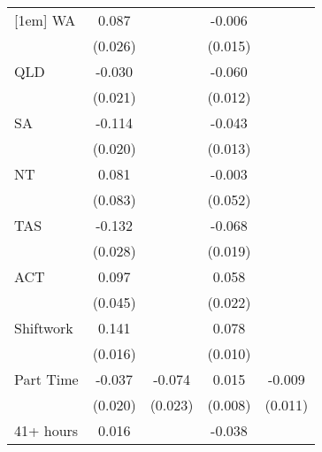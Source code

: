 {\begin{tabular}{l*{4}{c}}
[1em]
WA                  &       0.087\sym{***}&                     &      -0.006         &                     \\
                    &     (0.026)         &                     &     (0.015)         &                     \\
[1em]
QLD                 &      -0.030         &                     &      -0.060\sym{***}&                     \\
                    &     (0.021)         &                     &     (0.012)         &                     \\
[1em]
SA                  &      -0.114\sym{***}&                     &      -0.043\sym{**} &                     \\
                    &     (0.020)         &                     &     (0.013)         &                     \\
[1em]
NT                  &       0.081         &                     &      -0.003         &                     \\
                    &     (0.083)         &                     &     (0.052)         &                     \\
[1em]
TAS                 &      -0.132\sym{***}&                     &      -0.068\sym{***}&                     \\
                    &     (0.028)         &                     &     (0.019)         &                     \\
[1em]
ACT                 &       0.097\sym{*}  &                     &       0.058\sym{**} &                     \\
                    &     (0.045)         &                     &     (0.022)         &                     \\
[1em]
Shiftwork           &       0.141\sym{***}&                     &       0.078\sym{***}&                     \\
                    &     (0.016)         &                     &     (0.010)         &                     \\
[1em]
Part Time           &      -0.037         &      -0.074\sym{**} &       0.015         &      -0.009         \\
                    &     (0.020)         &     (0.023)         &     (0.008)         &     (0.011)         \\
[1em]
41+ hours           &       0.016         &                     &      -0.038\sym{**} &                     \\

\end{tabular}}
